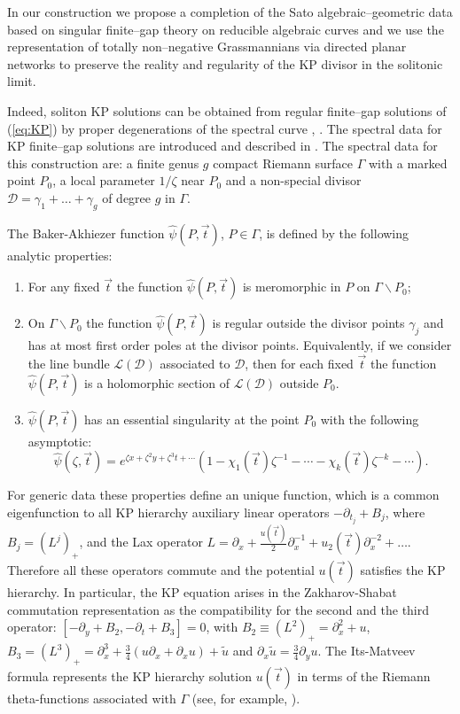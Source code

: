 \documentclass[11pt]{amsart}
\theoremstyle{plain}
\numberwithin{equation}{section}
\begin{document}
In our construction we propose a completion of the Sato algebraic--geometric data based on singular finite--gap theory on reducible algebraic curves \cite{Kr3, AG1,AG3} and we use the representation of totally non--negative Grassmannians via directed planar networks \cite{Pos} to preserve the reality and regularity of the KP divisor in the solitonic limit.

Indeed, soliton KP solutions can be obtained from regular finite--gap solutions of (\ref{eq:KP}) by proper degenerations of the spectral curve \cite{Kr2}, \cite{DKN}.  The spectral data for KP finite--gap solutions are introduced and described  in \cite{Kr1,Kr2}. The spectral data for this
construction are: a finite genus $g$ compact Riemann surface $\Gamma$ with a marked point $P_0$, a local parameter $1/\zeta$ near $P_0$ and a non-special 
divisor $\mathcal D=\gamma_1+\ldots+\gamma_g$ of degree $g$ in $\Gamma$.

The Baker-Akhiezer function $\hat\psi (P, \vec t)$, $P\in\Gamma$, is defined by the following analytic properties:
\begin{enumerate}
\item For any fixed $\vec t$ the function $\hat\psi (P, \vec t)$ is meromorphic in $P$ on $\Gamma\backslash P_0$;
\item On  $\Gamma\backslash P_0$ the function $\hat\psi (P, \vec t)$ is regular outside the divisor points $\gamma_j$ and has at most first order poles 
at the divisor points. Equivalently, if we consider the line bundle $\mathcal L(\mathcal D)$  associated to $\mathcal D$, then
for each fixed $\vec t$ the function $\hat\psi (P, \vec t)$ is a holomorphic section of $\mathcal L(\mathcal D)$ outside $P_0$.
\item $\hat\psi (P, \vec t)$ has an essential singularity at the point $P_0$ with the following asymptotic:
\[
{\hat \psi} (\zeta, \vec t) = e^{ \zeta x +\zeta^2 y +\zeta^3 t +\cdots} \left( 1 - \chi_1({\vec t})\zeta^{-1} - \cdots
-\chi_k({\vec t})\zeta^{-k}  - \cdots\right). 
\]
\end{enumerate}
For generic data these properties define an unique function, which is a common eigenfunction to all KP hierarchy auxiliary linear operators 
$-\partial_{t_j} + B_j$, where $B_j =(L^j)_+$, and the Lax operator $L=\partial_x+\frac{u(\vec t)}{2}\partial_x^{-1}+ u_2(\vec t)\partial_x^{-2}+\ldots.$
Therefore all these operators commute and the potential $u(\vec t)$ satisfies the KP hierarchy. In particular, the KP equation arises in the 
Zakharov-Shabat commutation representation \cite{ZS} as the compatibility for the second and the third operator:
$[ -\partial_y + B_2, -\partial_t +B_3] =0$, with $B_2 \equiv (L^2)_+ = \partial_x^2 + u$, $B_3 = (L^3)_+ = \partial_x^3 +\frac{3}{4} (u\partial_x +\partial_x u) + \tilde u$
and $\partial_x\tilde u =\frac{3}{4} \partial_y u$.
The Its-Matveev formula represents the KP hierarchy solution $u(\vec t)$ in terms of the Riemann theta-functions associated with $\Gamma$ (see, for example, \cite{Dub}). 
\end{document}
